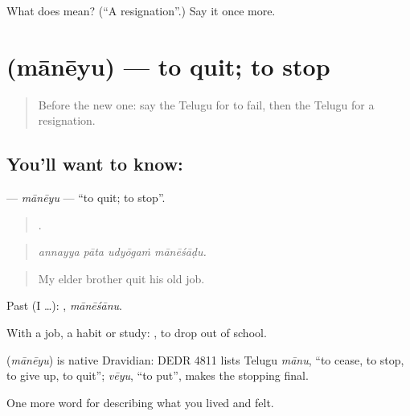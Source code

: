 \begin{tcolorbox}[breakable,colback=teal!4,colframe=teal!35!black,title={Before you move on}]
What does  mean? (\textquotedblleft{}A resignation\textquotedblright{}.) Say it once more.
\end{tcolorbox}
\section[\texorpdfstring{\te{మానేయు} (mānēyu)}{మానేయు (mānēyu)}]{ (mānēyu) — to quit; to stop}

\label{lesson:TE-C527-maneyu}



\begin{quote}
Before the new one: say the Telugu for to fail, then the Telugu for a resignation.
\end{quote}

\subsection*{You'll want to know: }
\textbf{} — \emph{mānēyu} — \textquotedblleft{}to quit; to stop\textquotedblright{}.

\begin{quote}
   .
\end{quote}

\begin{quote}
\emph{annayya pāta udyōgaṁ mānēśāḍu.}
\end{quote}

\begin{quote}
My elder brother quit his old job.
\end{quote}

Past (I …): , \emph{mānēśānu}.

With a job, a habit or study:  , to drop out of school.

\begin{cousinweb}
\textbf{} (\emph{mānēyu}) is native Dravidian: DEDR 4811 lists Telugu \emph{mānu}, \textquotedblleft{}to cease, to stop, to give up, to quit\textquotedblright{}; \emph{vēyu}, \textquotedblleft{}to put\textquotedblright{}, makes the stopping final.
\end{cousinweb}

\begin{grammarlens}[title={What you've built}]
One more word for describing what you lived and felt.
\end{grammarlens}

